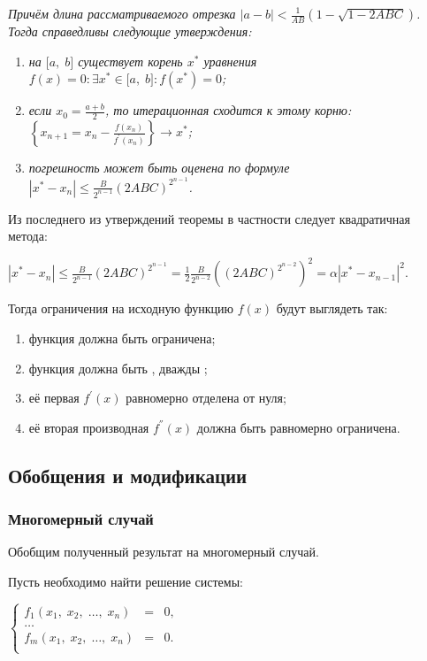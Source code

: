 \documentclass[a4paper]{article}
\begin{document}
{{{{{{{{\emph{Причём длина рассматриваемого отрезка
{{\(|a - b| < \frac{1}{AB}\left( {1 - \sqrt{1 - 2ABC}} \right)\)}}.
Тогда справедливы следующие утверждения:}

\begin{enumerate}
\item
  \emph{на {{\(\lbrack a,\; b\rbrack\)}} существует корень
  {{\(x^{\ast}\)}} уравнения
  {{\(f(x) = 0:\exists x^{\ast} \in \lbrack a,\; b\rbrack:f(x^{\ast}) = 0\)}};}
\item
  \emph{если {{\(x_{0} = \frac{a + b}{2}\)}}, то итерационная сходится к
  этому корню:
  {{\(\left\{ {x_{n + 1} = x_{n} - \frac{f(x_{n})}{f^{\prime}(x_{n})}} \right\}\rightarrow x^{\ast}\)}};}
\item
  \emph{погрешность может быть оценена по формуле
  {{\(|x^{\ast} - x_{n}| \leqslant \frac{B}{2^{n - 1}}(2ABC)^{2^{n - 1}}\)}}.}
\end{enumerate}

Из последнего из утверждений теоремы в частности следует квадратичная
метода:

{{\(|x^{\ast} - x_{n}| \leqslant \frac{B}{2^{n - 1}}(2ABC)^{2^{n - 1}} = \frac{1}{2}\frac{B}{2^{n - 2}}\left( {(2ABC)^{2^{n - 2}}} \right)^{2} = \alpha|x^{\ast} - x_{n - 1}|^{2}.\)}}

Тогда ограничения на исходную функцию {{\(f(x)\)}} будут выглядеть так:

\begin{enumerate}
\item
  функция должна быть ограничена;
\item
  функция должна быть , дважды ;
\item
  её первая {{\(f^{\prime}(x)\)}} равномерно отделена от нуля;
\item
  её вторая производная {{\(f^{''}(x)\)}} должна быть равномерно
  ограничена.
\end{enumerate}

\subsection{Обобщения и модификации}
\subsubsection{Многомерный случай}
Обобщим полученный результат на многомерный случай.

Пусть необходимо найти решение системы:

\begin{center}
    {\(\left\{ \begin{matrix}
    {f_{1}(x_{1},\; x_{2},\;\ldots,\; x_{n})} & = & {0,} \\
    \ldots & & \\
    {f_{m}(x_{1},\; x_{2},\;\ldots,\; x_{n})} & = & 0. \\
    \end{matrix} \right.\)}
\end{center}

}}}}}}}}
\end{document}
